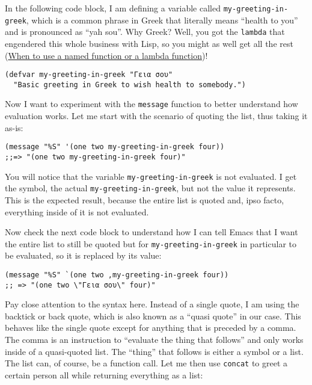 \documentclass[11pt]{ctexart}
\begin{document}
In the following code block, I am defining a variable called \texttt{my-greeting-in-greek}, which is a common phrase in Greek that literally means ``health to you'' and is pronounced as ``yah sou''. Why Greek? Well, you got the \texttt{lambda} that engendered this whole business with Lisp, so you might as well get all the rest (\hyperref[sec:org1669468]{When to use a named function or a lambda function})!

\begin{verbatim}
(defvar my-greeting-in-greek "Γεια σου"
  "Basic greeting in Greek to wish health to somebody.")
\end{verbatim}

Now I want to experiment with the \texttt{message} function to better understand how evaluation works. Let me start with the scenario of quoting the list, thus taking it as-is:

\begin{verbatim}
(message "%S" '(one two my-greeting-in-greek four))
;;=> "(one two my-greeting-in-greek four)"
\end{verbatim}

You will notice that the variable \texttt{my-greeting-in-greek} is not evaluated. I get the symbol, the actual \texttt{my-greeting-in-greek}, but not the value it represents. This is the expected result, because the entire list is quoted and, ipso facto, everything inside of it is not evaluated.

Now check the next code block to understand how I can tell Emacs that I want the entire list to still be quoted but for \texttt{my-greeting-in-greek} in particular to be evaluated, so it is replaced by its value:

\begin{verbatim}
(message "%S" `(one two ,my-greeting-in-greek four))
;; => "(one two \"Γεια σου\" four)"
\end{verbatim}

Pay close attention to the syntax here. Instead of a single quote, I am using the backtick or back quote, which is also known as a ``quasi quote'' in our case. This behaves like the single quote except for anything that is preceded by a comma. The comma is an instruction to ``evaluate the thing that follows'' and only works inside of a quasi-quoted list. The ``thing'' that follows is either a symbol or a list. The list can, of course, be a function call. Let me then use \texttt{concat} to greet a certain person all while returning everything as a list:
\end{document}
